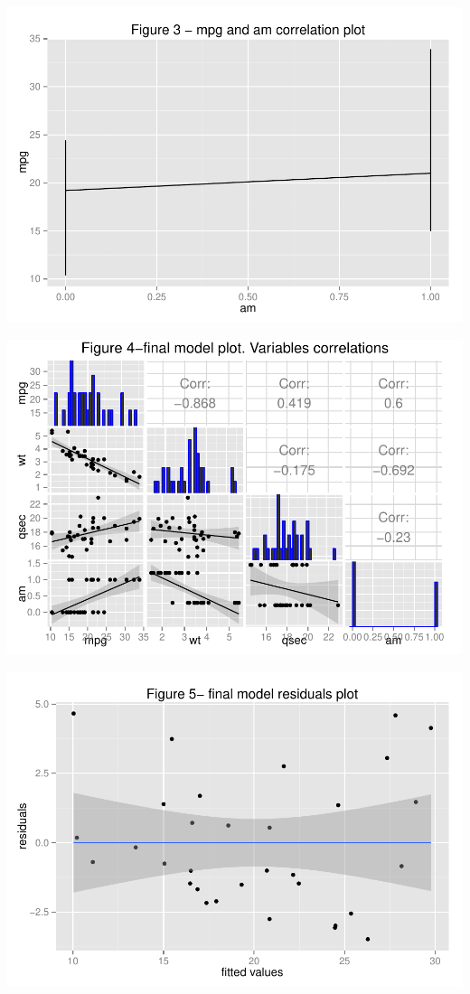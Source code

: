 \documentclass[10pt,]{article}
\begin{document}
\begin{flushleft}\includegraphics{project_files/figure-latex/mpg_am_correlation_plot-1} \end{flushleft}

\includegraphics{project_files/figure-latex/final_model_plot_correlation-1.pdf}

\begin{flushleft}\includegraphics{project_files/figure-latex/final_model_plot_fit_results-1} \end{flushleft}
\end{document}
